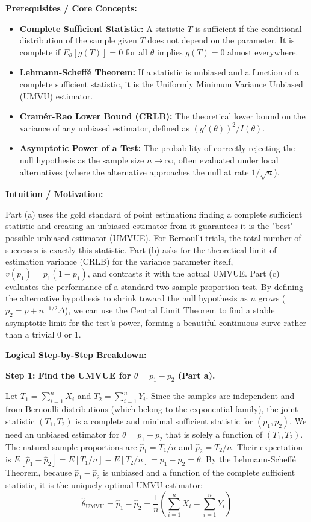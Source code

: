\begin{solution}
\textbf{Prerequisites / Core Concepts:}
\begin{itemize}
    \item \textbf{Complete Sufficient Statistic:} A statistic $T$ is sufficient if the conditional distribution of the sample given $T$ does not depend on the parameter. It is complete if $E_\theta[g(T)] = 0$ for all $\theta$ implies $g(T) = 0$ almost everywhere.
    \item \textbf{Lehmann-Scheffé Theorem:} If a statistic is unbiased and a function of a complete sufficient statistic, it is the Uniformly Minimum Variance Unbiased (UMVU) estimator.
    \item \textbf{Cramér-Rao Lower Bound (CRLB):} The theoretical lower bound on the variance of any unbiased estimator, defined as $(g'(\theta))^2 / I(\theta)$.
    \item \textbf{Asymptotic Power of a Test:} The probability of correctly rejecting the null hypothesis as the sample size $n \to \infty$, often evaluated under local alternatives (where the alternative approaches the null at rate $1/\sqrt{n}$).
\end{itemize}

\textbf{Intuition / Motivation:}

Part (a) uses the gold standard of point estimation: finding a complete sufficient statistic and creating an unbiased estimator from it guarantees it is the "best" possible unbiased estimator (UMVUE). For Bernoulli trials, the total number of successes is exactly this statistic.
Part (b) asks for the theoretical limit of estimation variance (CRLB) for the variance parameter itself, $v(p_1) = p_1(1-p_1)$, and contrasts it with the actual UMVUE.
Part (c) evaluates the performance of a standard two-sample proportion test. By defining the alternative hypothesis to shrink toward the null hypothesis as $n$ grows ($p_2 = p + n^{-1/2}\Delta$), we can use the Central Limit Theorem to find a stable asymptotic limit for the test's power, forming a beautiful continuous curve rather than a trivial 0 or 1.

\textbf{Logical Step-by-Step Breakdown:}

\textbf{Step 1: Find the UMVUE for $\theta = p_1 - p_2$ (Part a).}

Let $T_1 = \sum_{i=1}^n X_i$ and $T_2 = \sum_{i=1}^n Y_i$. Since the samples are independent and from Bernoulli distributions (which belong to the exponential family), the joint statistic $(T_1, T_2)$ is a complete and minimal sufficient statistic for $(p_1, p_2)$.
We need an unbiased estimator for $\theta = p_1 - p_2$ that is solely a function of $(T_1, T_2)$.
The natural sample proportions are $\hat{p}_1 = T_1/n$ and $\hat{p}_2 = T_2/n$.
Their expectation is $E[\hat{p}_1 - \hat{p}_2] = E[T_1/n] - E[T_2/n] = p_1 - p_2 = \theta$.
By the Lehmann-Scheffé Theorem, because $\hat{p}_1 - \hat{p}_2$ is unbiased and a function of the complete sufficient statistic, it is the uniquely optimal UMVU estimator:
\[ \hat{\theta}_{\text{UMVU}} = \hat{p}_1 - \hat{p}_2 = \frac{1}{n} \left( \sum_{i=1}^n X_i - \sum_{i=1}^n Y_i \right) \]


\end{solution}
